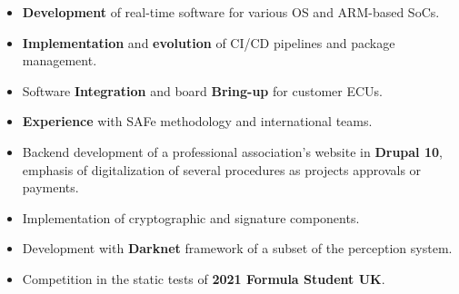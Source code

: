 \documentclass[10pt,a4paper,ragged2e,withhyper]{altacv}
\begin{document}
    \begin{paracol}{2}
    

     
                \begin{itemize}
                    \item \textbf{Development} of real-time software for various OS and ARM-based SoCs.
                    \item \textbf{Implementation} and \textbf{evolution} of CI/CD pipelines and package management.
                    \item Software \textbf{Integration} and board \textbf{Bring-up} for customer ECUs.
                    \item \textbf{Experience} with SAFe methodology and international teams.
                \end{itemize}

                \divider\newline
        
            
                \begin{itemize}
                    \item Backend development of a professional association's website in \textbf{Drupal 10}, emphasis of digitalization of several procedures as projects approvals or payments.
                    \item Implementation of cryptographic and signature components.
                \end{itemize}
                
                \divider\newline
            
                \begin{itemize}
                    \item Development with \textbf{Darknet} framework of a subset of the perception system. 
                    \item Competition in the static tests of \textbf{2021 Formula Student UK}.
                \end{itemize}
                

\end{paracol}
\end{document}
